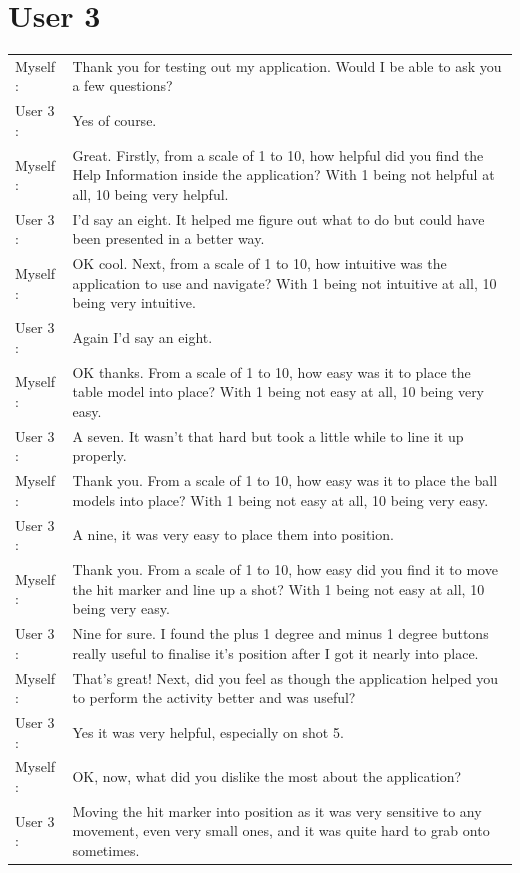 \documentclass[ %
                author={Finn Alexander Wilkinson},
                supervisor={Dr. Andrew Calway},
                degree={MEng},
                title={\centering A Mixed Reality Aim Assistant for Pool and Snooker},
                subtitle={},
                type={Enterprise},
                year={2021} ]{dissertation}
\begin{document}
\section{User 3}
\begin{tabular}{l p{130mm}}
    Myself : & Thank you for testing out my application. Would I be able to ask you a few questions? \\
    User 3 : & Yes of course.\\
    Myself : & Great. Firstly, from a scale of 1 to 10, how helpful did you find the Help Information inside the application? With 1 being not helpful at all, 10 being very helpful. \\
    User 3 : & I'd say an eight. It helped me figure out what to do but could have been presented in a better way.\\
    Myself : & OK cool. Next, from a scale of 1 to 10, how intuitive was the application to use and navigate? With 1 being not intuitive at all, 10 being very intuitive.\\
    User 3 : & Again I'd say an eight.\\
    Myself : & OK thanks. From a scale of 1 to 10, how easy was it to place the table model into place? With 1 being not easy at all, 10 being very easy.\\
    User 3 : & A seven. It wasn't that hard but took a little while to line it up properly.\\
    Myself : & Thank you. From a scale of 1 to 10, how easy was it to place the ball models into place? With 1 being not easy at all, 10 being very easy.\\ 
    User 3 : & A nine, it was very easy to place them into position. \\
    Myself : & Thank you. From a scale of 1 to 10, how easy did you find it to move the hit marker and line up a shot? With 1 being not easy at all, 10 being very easy. \\
    User 3 : & Nine for sure. I found the plus 1 degree and minus 1 degree buttons really useful to finalise it's position after I got it nearly into place. \\
    Myself : & That's great! Next, did you feel as though the application helped you to perform the activity better and was useful? \\
    User 3 : & Yes it was very helpful, especially on shot 5. \\
    Myself : & OK, now, what did you dislike the most about the application? \\
    User 3 : & Moving the hit marker into position as it was very sensitive to any movement, even very small ones, and it was quite hard to grab onto sometimes. \\

\end{tabular}
\end{document}
